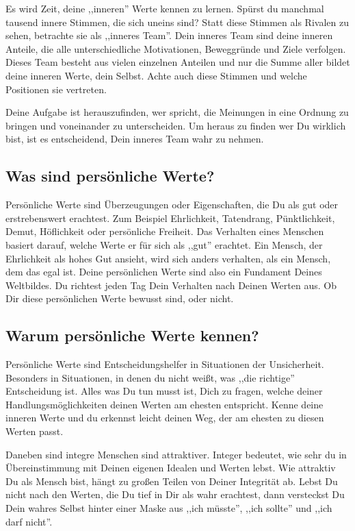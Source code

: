 \documentclass[../Lebensziel.tex]{subfiles}
\begin{document}
Es wird Zeit, deine ,,inneren'' Werte kennen zu lernen. Spürst du manchmal tausend innere Stimmen, die sich uneins sind? Statt diese Stimmen als Rivalen zu sehen, betrachte sie als ,,inneres Team''. Dein inneres Team sind deine inneren Anteile, die alle unterschiedliche Motivationen, Beweggründe und Ziele verfolgen. Dieses Team besteht aus vielen einzelnen Anteilen und nur die Summe aller bildet deine inneren Werte, dein Selbst. Achte auch diese Stimmen und welche Positionen sie vertreten.

Deine Aufgabe ist herauszufinden, wer spricht, die Meinungen in eine Ordnung zu bringen und voneinander zu unterscheiden.
Um heraus zu finden wer Du wirklich bist, ist es entscheidend, Dein inneres Team wahr zu nehmen.

\subsection{Was sind persönliche Werte?}
Persönliche Werte sind Überzeugungen oder Eigenschaften, die Du als gut oder erstrebenswert erachtest. Zum Beispiel Ehrlichkeit, Tatendrang, Pünktlichkeit, Demut, Höflichkeit oder persönliche Freiheit. Das Verhalten eines Menschen basiert darauf, welche Werte er für sich als ,,gut'' erachtet. Ein Mensch, der Ehrlichkeit als hohes Gut ansieht, wird sich anders verhalten, als ein Mensch, dem das egal ist.
Deine persönlichen Werte sind also ein Fundament Deines Weltbildes. Du richtest jeden Tag Dein Verhalten nach Deinen Werten aus. Ob Dir diese persönlichen Werte bewusst sind, oder nicht.

\subsection{Warum persönliche Werte kennen?}
Persönliche Werte sind Entscheidungshelfer in Situationen der Unsicherheit. Besonders in Situationen, in denen du nicht weißt, was ,,die richtige'' Entscheidung ist. Alles was Du tun musst ist, Dich zu fragen, welche deiner Handlungsmöglichkeiten deinen Werten am ehesten entspricht. Kenne deine inneren Werte und du erkennst leicht deinen Weg, der am ehesten zu diesen Werten passt.

Daneben sind integre Menschen sind attraktiver. Integer bedeutet, wie sehr du in Übereinstimmung mit Deinen eigenen Idealen und Werten lebst. Wie attraktiv Du als Mensch bist, hängt zu großen Teilen von Deiner Integrität ab. Lebst Du nicht nach den Werten, die Du tief in Dir als wahr erachtest, dann versteckst Du Dein wahres Selbst hinter einer Maske aus ,,ich müsste'', ,,ich sollte'' und ,,ich darf nicht''.
\end{document}
